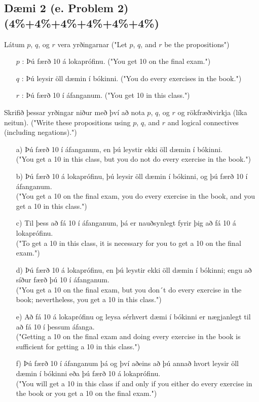 \newpage
\subsection*{Dæmi 2 (e. Problem 2) (4\%+4\%+4\%+4\%+4\%+4\%)\label{section:problem2}}
Látum $p$, $q$, og $r$ vera yrðingarnar ("Let $p$, $q$, and $r$ be the propositions")
\begin{itemize}
    \item [$p$ :] Þú færð 10 á lokaprófinu. ("You get 10 on the final exam.")
    \item [$q$ :] Þú leysir öll dæmin í bókinni. ("You do every exercises in the book.") 
    \item [$r$ :] Þú færð 10 í áfanganum. ("You get 10 in this class.") 
\end{itemize}
Skrifið þessar yrðingar niður með því að nota $p$, $q$, og $r$ og rökfræðivirkja (líka neitun). ("Write these propositions using $p$, $q$, and $r$ and logical connectives (including negations).")

\begin{itemize}
    \item [a)] Þú færð 10 í áfanganum, en þú leystir ekki öll dæmin í bókinni. \\("You get a 10 in this class, but you do not do every exercise in the book.")
     \item [b)] Þú færð 10 á lokaprófinu, þú leysir öll dæmin í bókinni, og þú færð 10 í áfanganum.\\ ("You get a 10 on the final exam, you do every exercise in the book, and you get a 10 in this class.")
     \item [c)] Til þess að fá 10 í áfanganum, þá er nauðsynlegt fyrir þig að fá 10 á lokaprófinu.\\ ("To get a 10 in this class, it is necessary for you to get a 10 on the final exam.")
     \item [d)] Þú færð 10 á lokaprófinu, en þú leystir ekki öll dæmin í bókinni; engu að síður færð þú 10 í áfanganum.\\ ("You get a 10 on the final exam, but you don´t do every exercise in the book; nevertheless, you get a 10 in this class.")
     \item [e)] Að fá 10 á lokaprófinu og leysa sérhvert dæmi í bókinni er nægjanlegt til að fá 10 í þessum áfanga.\\("Getting a 10 on the final exam and doing every exercise in the book is sufficient for getting a 10 in this class.")
     \item [f)] Þú færð 10 í áfanganum þá og því aðeins að þú annað hvort leysir öll dæmin í bókinni eða þú færð 10 á lokaprófinu.\\ ("You will get a 10 in this class if and only if you either do every exercise in the book or you get a 10 on the final exam.")
\end{itemize}
